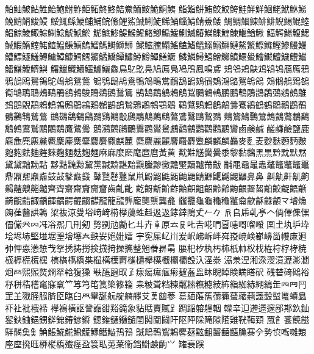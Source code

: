 鮊󠄀鮋󠄀鮍󠄀鮎󠄀鮏󠄀鮐󠄀鮑󠄀鮒󠄀鮓󠄀鮔󠄀鮖󠄀鮗󠄀鮗󠄁鮚󠄀鮝󠄀鮞󠄀鮟󠄀鮠󠄀鮦󠄀鮧󠄀
鮨󠄀鮨󠄁鮩󠄀鮪󠄀鮫󠄀鮫󠄁鮬󠄀鮭󠄀鮮󠄀鮮󠄁鮰󠄀鮱󠄀鮲󠄀鮴󠄀鮷󠄀鮸󠄀鮹󠄀鮹󠄁鮻󠄀鮼󠄀
鮾󠄀鮿󠄀鯀󠄀鯁󠄀鯆󠄀鯆󠄁鯇󠄀鯈󠄀鯉󠄀鯊󠄀鯎󠄀鯏󠄀鯐󠄀鯑󠄀鯒󠄀鯔󠄀鯖󠄀鯖󠄁鯗󠄀鯘󠄀
鯛󠄀鯛󠄁鯝󠄀鯟󠄀鯡󠄀鯡󠄁鯢󠄀鯣󠄀鯤󠄀鯥󠄀鯧󠄀鯨󠄀鯪󠄀鯫󠄀鯮󠄀鯯󠄀鯰󠄀鯱󠄀鯱󠄁鯲󠄀
鯲󠄁鯳󠄀鯵󠄀鯷󠄀鯸󠄀鯹󠄀鯺󠄀鯽󠄀鯿󠄀鰀󠄀鰂󠄀鰄󠄀鰆󠄀鰈󠄀鰈󠄁鰉󠄀鰊󠄀鰋󠄀鰌󠄀鰍󠄀
鰏󠄀鰐󠄀鰑󠄀鰒󠄀鰓󠄀鰔󠄀鰕󠄀鰖󠄀鰘󠄀鰙󠄀鰚󠄀鰛󠄀鰜󠄀鰝󠄀鰞󠄀鰡󠄀鰢󠄀鰣󠄀鰤󠄀鰤󠄁
鰥󠄀鰦󠄀鰧󠄀鰨󠄀鰩󠄀鰪󠄀鰭󠄀鰮󠄀鰯󠄀鰯󠄁鰰󠄀鰱󠄀鰲󠄀鰵󠄀鰶󠄀鰷󠄀鰹󠄀鰺󠄀鰻󠄀鰻󠄁
鰽󠄀鰾󠄀鱁󠄀鱃󠄀鱄󠄀鱅󠄀鱆󠄀鱇󠄀鱈󠄀鱈󠄁鱉󠄀鱊󠄀鱎󠄀鱏󠄀鱐󠄀鱒󠄀鱒󠄁鱓󠄀鱔󠄀鱖󠄀
鱗󠄀鱗󠄁鱘󠄀鱚󠄀鱛󠄀鱜󠄀鱝󠄀鱞󠄀鱟󠄀鱠󠄀鱡󠄀鱣󠄀鱥󠄀鱧󠄀鱨󠄀鱩󠄀鱪󠄀鱫󠄀鱭󠄀鱮󠄀
鱰󠄀鱲󠄀鱵󠄀鱶󠄀鱷󠄀鱸󠄀鱺󠄀鱻󠄀鳥󠄀鳦󠄀鳦󠄁鳧󠄀鳩󠄀鳫󠄀鳬󠄀鳰󠄀鳲󠄀鳳󠄀鳴󠄀鳶󠄀
鳷󠄀鳹󠄀鴂󠄀鴃󠄀鴆󠄀鴇󠄀鴇󠄁鴈󠄀鴈󠄁鴉󠄀鴉󠄁鴋󠄀鴎󠄀鴑󠄀鴒󠄀鴕󠄀鴗󠄀鴘󠄀鴛󠄀鴜󠄀
鴝󠄀鴞󠄀鴟󠄀鴣󠄀鴦󠄀鴨󠄀鴪󠄀鴫󠄀鴬󠄀鴯󠄀鴰󠄀鴲󠄀鴳󠄀鴴󠄀鴺󠄀鴻󠄀鴼󠄀鴽󠄀鴾󠄀鴿󠄀
鵁󠄀鵂󠄀鵃󠄀鵄󠄀鵅󠄀鵆󠄀鵇󠄀鵈󠄀鵈󠄁鵊󠄀鵐󠄀鵑󠄀鵒󠄀鵓󠄀鵔󠄀鵙󠄀鵜󠄀鵝󠄀鵞󠄀鵟󠄀
鵠󠄀鵠󠄁鵡󠄀鵢󠄀鵣󠄀鵤󠄀鵥󠄀鵩󠄀鵪󠄀鵫󠄀鵬󠄀鵬󠄁鵯󠄀鵰󠄀鵲󠄀鵳󠄀鵶󠄀鵷󠄀鵺󠄀鵻󠄀
鵼󠄀鵾󠄀鶃󠄀鶄󠄀鶆󠄀鶇󠄀鶉󠄀鶊󠄀鶍󠄀鶎󠄀鶏󠄀鶒󠄀鶓󠄀鶕󠄀鶖󠄀鶗󠄀鶘󠄀鶙󠄀鶚󠄀鶡󠄀
鶤󠄀鶩󠄀鶪󠄀鶫󠄀鶬󠄀鶮󠄀鶯󠄀鶱󠄀鶲󠄀鶴󠄀鶴󠄁鶵󠄀鶸󠄀鶹󠄀鶺󠄀鶻󠄀鶼󠄀鶽󠄀鶿󠄀鶿󠄁
鷀󠄀鷀󠄁鷁󠄀鷂󠄀鷂󠄁鷃󠄀鷄󠄀鷆󠄀鷇󠄀鷉󠄀鷊󠄀鷏󠄀鷏󠄁鷓󠄀鷔󠄀鷕󠄀鷖󠄀鷗󠄀鷙󠄀鷚󠄀
鷞󠄀鷟󠄀鷠󠄀鷣󠄀鷥󠄀鷦󠄀鷧󠄀鷩󠄀鷫󠄀鷭󠄀鷮󠄀鷯󠄀鷰󠄀鷲󠄀鷳󠄀鷴󠄀鷸󠄀鷹󠄀鷺󠄀鷽󠄀
鷾󠄀鸂󠄀鸇󠄀鸊󠄀鸍󠄀鸎󠄀鸐󠄀鸑󠄀鸒󠄀鸕󠄀鸖󠄀鸙󠄀鸚󠄀鸛󠄀鸜󠄀鸝󠄀鸞󠄀鹵󠄀鹸󠄀鹹󠄀
鹺󠄀鹻󠄀鹼󠄀鹽󠄀鹿󠄀麀󠄀麁󠄀麂󠄀麃󠄀麄󠄀麅󠄀麇󠄀麈󠄀麋󠄀麌󠄀麎󠄀麏󠄀麑󠄀麒󠄀麓󠄀
麕󠄀麖󠄀麗󠄀麗󠄁麘󠄀麛󠄀麝󠄀麞󠄀麟󠄀麟󠄁麟󠄂麤󠄀麥󠄀麥󠄁麦󠄀麨󠄀麩󠄀麪󠄀麪󠄁麬󠄀
麭󠄀麭󠄁麮󠄀麯󠄀麰󠄀麳󠄀麴󠄀麵󠄀麸󠄀麹󠄀麺󠄀麻󠄀麻󠄁麼󠄀麽󠄀麾󠄀麿󠄀麿󠄁黃󠄀黄󠄀
黆󠄀黈󠄀黋󠄀黌󠄀黌󠄁黍󠄀黎󠄀黏󠄀黐󠄀黑󠄀黒󠄀黔󠄀黕󠄀默󠄀黙󠄀黛󠄀黛󠄁黜󠄀黝󠄀點󠄀
黟󠄀黠󠄀黤󠄀黥󠄀黧󠄀黨󠄀黬󠄀黭󠄀黮󠄀黯󠄀黰󠄀黱󠄀黲󠄀黴󠄀黵󠄀黶󠄀黷󠄀黸󠄀黹󠄀黻󠄀
黼󠄀黽󠄀黿󠄀鼂󠄀鼃󠄀鼇󠄀鼈󠄀鼈󠄁鼈󠄂鼉󠄀鼎󠄀鼏󠄀鼐󠄀鼑󠄀鼒󠄀鼓󠄀鼔󠄀鼕󠄀鼖󠄀鼗󠄀
鼙󠄀鼚󠄀鼛󠄀鼟󠄀鼠󠄀鼡󠄀鼢󠄀鼦󠄀鼪󠄀鼫󠄀鼬󠄀鼯󠄀鼱󠄀鼲󠄀鼴󠄀鼷󠄀鼹󠄀鼺󠄀鼻󠄀鼻󠄁
鼼󠄀鼽󠄀鼾󠄀鼿󠄀齁󠄀齃󠄀齄󠄀齅󠄀齆󠄀齇󠄀齊󠄀齊󠄁齋󠄀齋󠄁齎󠄀齎󠄁齏󠄀齒󠄀齓󠄀齔󠄀
齕󠄀齖󠄀齗󠄀齘󠄀齚󠄀齝󠄀齞󠄀齟󠄀齠󠄀齡󠄀齢󠄀齣󠄀齦󠄀齧󠄀齧󠄁齨󠄀齩󠄀齪󠄀齬󠄀齭󠄀
齮󠄀齯󠄀齰󠄀齱󠄀齲󠄀齳󠄀齵󠄀齶󠄀齷󠄀齺󠄀齽󠄀龍󠄀龍󠄁龍󠄂龏󠄀龐󠄀龑󠄀龒󠄀龔󠄀龕󠄀
龖󠄀龗󠄀龜󠄀龜󠄁龝󠄀龝󠄁龞󠄀龠󠄀龡󠄀龢󠄀龣󠄀龥󠄀龴󠄀龼󠄀龽󠄀龾󠄀龿󠄀鿀󠄀鿁󠄀鿂󠄀
鿄󠄀鿆󠄀鿌󠄀﨎󠄀﨏󠄀﨑󠄀﨑󠄁﨓󠄀﨔󠄀﨟󠄀﨡󠄀﨣󠄀﨤󠄀﨤󠄁﨧󠄀﨨󠄀﨩󠄀𠀋󠄀𠂉󠄀𠂊󠄀
𠂢󠄀𠂤󠄀𠂰󠄀𠃵󠄀𠅘󠄀𠆢󠄀𠈓󠄀𠌫󠄀𠍱󠄀𠎁󠄀𠏹󠄀𠑊󠄀𠔉󠄀𠔿󠄀𠖱󠄀𠗖󠄀𠘑󠄀𠘨󠄀𠛬󠄀𠝏󠄀
𠟈󠄀𠠇󠄀𠠺󠄀𠢹󠄀𠤎󠄀𠥼󠄀𠦄󠄀𠦝󠄀𠩤󠄀𠫓󠄀𠬝󠄀𠮟󠄀𠮷󠄀𠵅󠄀𠵘󠄀𠷡󠄀𠹤󠄀𠹭󠄀𠺕󠄀𠽟󠄀
𡈁󠄀𡈽󠄀𡉕󠄀𡉴󠄀𡉻󠄀𡋗󠄀𡋤󠄀𡋽󠄀𡌛󠄀𡌶󠄀𡍄󠄀𡏄󠄀𡑭󠄀𡑮󠄀𡗗󠄀𡙇󠄀𡚴󠄀𡜆󠄀𡝂󠄀𡢽󠄀
𡧃󠄀𡨚󠄀𡱖󠄀𡴭󠄀𡵅󠄀𡵢󠄀𡵸󠄀𡶒󠄀𡶜󠄀𡶡󠄀𡶷󠄀𡷠󠄀𡸳󠄀𡸴󠄀𡼞󠄀𡽶󠄀𡿺󠄀𢅻󠄀𢈘󠄀𢌞󠄀
𢎭󠄀𢘉󠄀𢛳󠄀𢡛󠄀𢢫󠄀𢦏󠄀𢪸󠄀𢭆󠄀𢭏󠄀𢭐󠄀𢮦󠄀𢰝󠄀𢰤󠄀𢷡󠄀𢹂󠄀𢿫󠄀𣆶󠄀𣇃󠄀𣇄󠄀𣇵󠄀
𣍲󠄀𣏌󠄀𣏐󠄀𣏒󠄀𣏓󠄀𣏕󠄀𣏚󠄀𣏟󠄀𣏤󠄀𣏾󠄀𣑊󠄀𣑋󠄀𣑑󠄀𣑥󠄀𣓤󠄀𣕚󠄀𣖔󠄀𣗄󠄀𣗄󠄁𣘸󠄀
𣘹󠄀𣘺󠄀𣘺󠄁𣘺󠄂𣙇󠄀𣜌󠄀𣜜󠄀𣜿󠄀𣝣󠄀𣝤󠄀𣟧󠄀𣟱󠄀𣟿󠄀𣠤󠄀𣠽󠄀𣠽󠄁𣪘󠄀𣱿󠄀𣲾󠄀𣳾󠄀
𣴀󠄀𣴎󠄀𣵀󠄀𣷓󠄀𣷹󠄀𣷺󠄀𣽾󠄀𤁋󠄀𤂖󠄀𤄃󠄀𤇆󠄀𤇾󠄀𤋮󠄀𤋮󠄁𤎼󠄀𤏐󠄀𤘩󠄀𤚥󠄀𤟱󠄀𤢖󠄀
𤩍󠄀𤭖󠄀𤭯󠄀𤰖󠄀𤴔󠄀𤸄󠄀𤸎󠄀𤸷󠄀𤹪󠄀𤺋󠄀𤿲󠄀𥁊󠄀𥁕󠄀𥄢󠄀𥆩󠄀𥇍󠄀𥇥󠄀𥈞󠄀𥉌󠄀𥐮󠄀
𥒎󠄀𥓙󠄀𥔎󠄀𥖧󠄀𥙿󠄀𥝱󠄀𥞩󠄀𥞴󠄀𥡴󠄀𥧄󠄀𥧌󠄀𥧔󠄀𥫗󠄀𥫣󠄀𥫤󠄀𥫱󠄀𥮲󠄀𥱋󠄀𥱤󠄀𥶡󠄀
𥸮󠄀𥹖󠄀𥹢󠄀𥹥󠄀𥻂󠄀𥻘󠄀𥻨󠄀𥼣󠄀𥽜󠄀𥿔󠄀𥿠󠄀𥿻󠄀𦀌󠄀𦀗󠄀𦁠󠄀𦃭󠄀𦈢󠄀𦉪󠄀𦉰󠄀𦉰󠄁
𦊆󠄀𦍌󠄀𦐂󠄀𦙾󠄀𦚰󠄀𦜝󠄀𦣝󠄀𦣪󠄀𦥑󠄀𦥯󠄀𦦙󠄀𦧝󠄀𦨞󠄀𦩘󠄀𦪌󠄀𦪷󠄀𦫿󠄀𦰩󠄀𦱳󠄀𦲞󠄀
𦳝󠄀𦹀󠄀𦹥󠄀𦾔󠄀𦿶󠄀𦿷󠄀𦿸󠄀𧃴󠄀𧄍󠄀𧄹󠄀𧏚󠄀𧏛󠄀𧏾󠄀𧐐󠄀𧑉󠄀𧘔󠄀𧘕󠄀𧘱󠄀𧚄󠄀𧚓󠄀
𧜎󠄀𧜣󠄀𧝒󠄀𧦅󠄀𧦴󠄀𧪄󠄀𧮳󠄀𧮾󠄀𧯇󠄀𧰼󠄀𧲸󠄀𧵳󠄀𧶠󠄀𧸐󠄀𧾷󠄀𨂊󠄀𨂻󠄀𨉷󠄀𨊂󠄀𨋳󠄀
𨏍󠄀𨐌󠄀𨑕󠄀𨕫󠄀𨗈󠄀𨗉󠄀𨛗󠄀𨛺󠄀𨥆󠄀𨥉󠄀𨥫󠄀𨦇󠄀𨦈󠄀𨦺󠄀𨦻󠄀𨨞󠄀𨨩󠄀𨩃󠄀𨩱󠄀𨪙󠄀
𨫍󠄀𨫝󠄀𨫤󠄀𨯁󠄀𨯯󠄀𨳝󠄀𨴐󠄀𨵱󠄀𨷻󠄀𨸗󠄀𨸟󠄀𨸶󠄀𨺉󠄀𨻫󠄀𨻶󠄀𨼲󠄀𨿸󠄀𩊠󠄀𩊱󠄀𩒐󠄀
𩗏󠄀𩙿󠄀𩛰󠄀𩜙󠄀𩝐󠄀𩣆󠄀𩩲󠄀𩵋󠄀𩵋󠄁𩷛󠄀𩸕󠄀𩸽󠄀𩸽󠄁𩹉󠄀𩺊󠄀𩻄󠄀𩻛󠄀𩻩󠄀𩿎󠄀𩿗󠄀
𪀚󠄀𪀯󠄀𪂂󠄀𪃹󠄀𪆐󠄀𪊲󠄀𪎌󠄀𪐷󠄀𪗱󠄀𪘂󠄀𪘚󠄀𪘚󠄁𪚲󠄀𪧦󠄀𫝆󠄀𫝑󠄀𫝓󠄀𫝚󠄀𫝜󠄀𫝥󠄀
𫝶󠄀𫝷󠄀𫝼󠄀𫞂󠄀𫞉󠄀𫞋󠄀𫞎󠄀𫞔󠄀𫞬󠄀𫞯󠄀𫞽󠄀𫟉󠄀𫟏󠄀𫟒󠄀𫟘󠄀𫟰󠄀𫠍󠄀𫠗󠄀𫠚󠄀𭕄󠄀
𮉸󠄀𮕩󠄀𮛪󠄀𱍐󠄀

